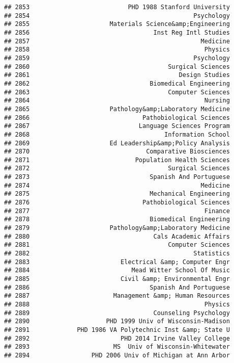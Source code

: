 \documentclass[
]{article}
\begin{document}
\begin{verbatim}
## 2853                           PHD 1988 Stanford University
## 2854                                             Psychology
## 2855                      Materials Science&amp;Engineering
## 2856                                  Inst Reg Intl Studies
## 2857                                               Medicine
## 2858                                                Physics
## 2859                                             Psychology
## 2860                                      Surgical Sciences
## 2861                                         Design Studies
## 2862                                 Biomedical Engineering
## 2863                                      Computer Sciences
## 2864                                                Nursing
## 2865                      Pathology&amp;Laboratory Medicine
## 2866                               Pathobiological Sciences
## 2867                              Language Sciences Program
## 2868                                     Information School
## 2869                      Ed Leadership&amp;Policy Analysis
## 2870                                Comparative Biosciences
## 2871                             Population Health Sciences
## 2872                                      Surgical Sciences
## 2873                                 Spanish And Portuguese
## 2874                                               Medicine
## 2875                                 Mechanical Engineering
## 2876                               Pathobiological Sciences
## 2877                                                Finance
## 2878                                 Biomedical Engineering
## 2879                      Pathology&amp;Laboratory Medicine
## 2880                                  Cals Academic Affairs
## 2881                                      Computer Sciences
## 2882                                             Statistics
## 2883                         Electrical &amp; Computer Engr
## 2884                            Mead Witter School Of Music
## 2885                         Civil &amp; Environmental Engr
## 2886                                 Spanish And Portuguese
## 2887                       Management &amp; Human Resources
## 2888                                                Physics
## 2889                                  Counseling Psychology
## 2890                     PHD 1999 Univ of Wisconsin-Madison
## 2891             PHD 1986 VA Polytechnic Inst &amp; State U
## 2892                         PHD 2014 Irvine Valley College
## 2893                       MS  Univ of Wisconsin-Whitewater
## 2894                 PHD 2006 Univ of Michigan at Ann Arbor

\end{verbatim}
\end{document}
